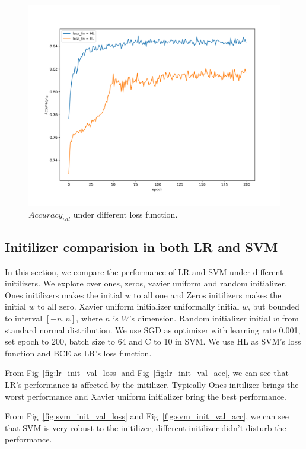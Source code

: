 \documentclass[journal, a4paper]{IEEEtran}
\begin{document}
\begin{figure}[!hbt]
	\begin{center}
		\includegraphics[width=\columnwidth]{l_val_acc}
		\caption{$Accuracy_{val}$ under different loss function.}
		\label{fig:l_val_acc}
	\end{center}
\end{figure} \par

\subsection{Initilizer comparision in both LR and SVM}
In this section, we compare the performance of LR and SVM under different initilizers. We explore over ones, zeros, xavier uniform and random initializer. Ones initilizers makes the initial $w$ to all one and Zeros initilizers makes the initial $w$ to all zero. Xavier uniform initializer uniformally initial $w$, but bounded to interval $[-n, n]$, where $n$ is $W$'s dimension. Random initializer initial $w$ from standard normal distribution. We use SGD as optimizer with learning rate 0.001, set epoch to 200, batch size to 64 and C to 10 in SVM. We use HL as SVM's loss function and BCE as LR's loss function.\par
From Fig~\ref{fig:lr_init_val_loss} and Fig~\ref{fig:lr_init_val_acc}, we can see that LR's performance is affected by the initilizer. Typically Ones initilizer brings the worst performance and Xavier uniform initializer bring the best performance. \par
From Fig~\ref{fig:svm_init_val_loss} and Fig~\ref{fig:svm_init_val_acc}, we can see that SVM is very robust to the initilizer, different initilizer didn't disturb the performance. \par
\end{document}
